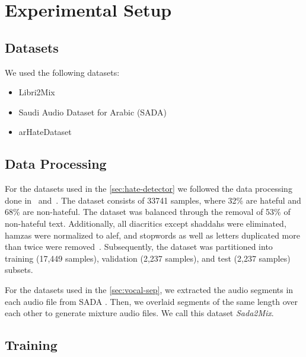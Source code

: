 \documentclass[10pt,twocolumn,letterpaper]{article}
\begin{document}
\section{Experimental Setup}
\subsection{Datasets}
    We used the following datasets:
    \begin{itemize}
        \item 
            Libri2Mix \cite{cosentinoLibriMixOpenSourceDataset2020}
        \item 
            Saudi Audio Dataset for Arabic (SADA) \cite{alowisheqSADASaudiAudio2023}
        \item 
            arHateDataset~\cite{khezzarArHateDetectorDetectionHate2023} 
    \end{itemize}
\subsection{Data Processing}


For the datasets used in the \cref{sec:hate-detector} we followed the data processing done in~\cite[][Sec. 3.2]{shapiroAlexUAICArabicHate2022} and~\cite{hegaziPreprocessingArabicText2021}. The dataset consists of 33741 samples, where 32\% are hateful and 68\% are non-hateful.
The dataset was balanced through the removal of 53\% of non-hateful text. Additionally, all diacritics except shaddahs were eliminated, hamzas were normalized to alef, and stopwords as well as letters duplicated more than twice were removed~\cite{albadiAreTheyOur2018}. Subsequently, the dataset was partitioned into training (17,449 samples), validation (2,237 samples), and test (2,237 samples) subsets.

For the datasets used in the \cref{sec:vocal-sep}, we extracted the audio segments in each audio file from SADA \cite{alowisheqSADASaudiAudio2023}.
Then, we overlaid segments of the same length over each other to generate mixture audio files.
We call this dataset \emph{Sada2Mix}.


\subsection{Training}
\end{document}
